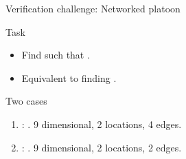 \begin{frame}{Verification challenge: Networked platoon}
\begin{alertblock}{Task}
\begin{itemize}
\item Find  such that .
\item Equivalent to finding .
\end{itemize}
\end{alertblock}
%
\begin{exampleblock}{Two cases}
\begin{enumerate}
\item {}: . {\color{violet} 9 dimensional, 2 locations, 4 edges}.
\item {}: . {\color{violet} 9 dimensional, 2 locations, 2 edges}.
\end{enumerate}
\end{exampleblock}
\end{frame}

